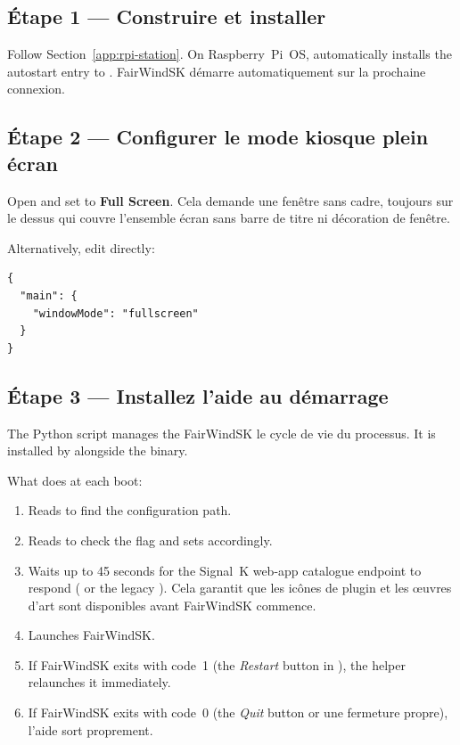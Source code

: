 \subsection{Étape 1 --- Construire et installer}

Follow Section~\ref{app:rpi-station}.
On Raspberry~Pi~OS,  automatically installs the
 autostart entry to
.
FairWindSK démarre automatiquement sur la prochaine connexion.

\subsection{Étape 2 --- Configurer le mode kiosque plein écran}

Open  and set  to
\textbf{Full Screen}.
Cela demande une fenêtre sans cadre, toujours sur le dessus qui couvre l'ensemble
écran sans barre de titre ni décoration de fenêtre.

Alternatively, edit  directly:

\begin{lstlisting}
{
  "main": {
    "windowMode": "fullscreen"
  }
}
\end{lstlisting}

\subsection{Étape 3 --- Installez l'aide au démarrage}

The  Python script manages the FairWindSK
le cycle de vie du processus.
It is installed by  alongside the binary.

What  does at each boot:

\begin{enumerate}
  \item Reads  to find the configuration path.
  \item Reads  to check the 
        flag and sets  accordingly.
  \item Waits up to 45 seconds for the Signal~K web-app catalogue
        endpoint to respond ( or the legacy
        ).
Cela garantit que les icônes de plugin et les œuvres d'art sont disponibles avant
FairWindSK commence.
  \item Launches FairWindSK.
  \item If FairWindSK exits with code~1 (the \textit{Restart} button in
        ), the helper relaunches it immediately.
  \item If FairWindSK exits with code~0 (the \textit{Quit} button or
une fermeture propre), l'aide sort proprement.
\end{enumerate}

